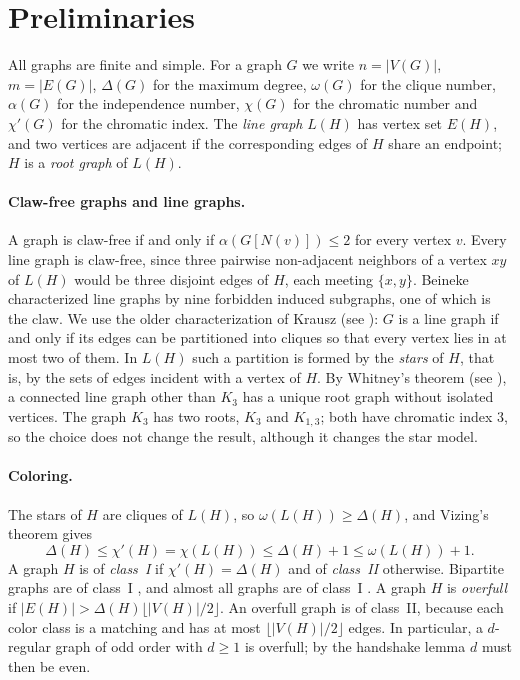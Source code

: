 \documentclass[11pt,a4paper]{article}
\begin{document}
\section{Preliminaries}

All graphs are finite and simple. For a graph $G$ we write $n=|V(G)|$,
$m=|E(G)|$, $\Delta(G)$ for the maximum degree, $\omega(G)$ for the clique
number, $\alpha(G)$ for the independence number, $\chi(G)$ for the chromatic
number and $\chi'(G)$ for the chromatic index. The \emph{line graph} $L(H)$ has
vertex set $E(H)$, and two vertices are adjacent if the corresponding edges of
$H$ share an endpoint; $H$ is a \emph{root graph} of $L(H)$.

\paragraph{Claw-free graphs and line graphs.}
A graph is claw-free if and only if $\alpha(G[N(v)])\le 2$ for every vertex $v$.
Every line graph is claw-free, since three pairwise non-adjacent neighbors of
a vertex $xy$ of $L(H)$ would be three disjoint edges of $H$, each meeting
$\{x,y\}$. Beineke \cite{beineke1970} characterized line graphs by nine
forbidden induced subgraphs, one of which is the claw. We use the older
characterization of Krausz (see \cite{beineke1970,liu2015}): $G$ is a line
graph if and only if its edges can be partitioned into cliques so that every
vertex lies in at most two of them. In $L(H)$ such a partition is formed by the
\emph{stars} of $H$, that is, by the sets of edges incident with a vertex of
$H$. By Whitney's theorem (see \cite{liu2015}), a connected line graph other
than $K_3$ has a unique root graph without isolated vertices. The graph $K_3$
has two roots, $K_3$ and $K_{1,3}$; both have chromatic index $3$, so the choice
does not change the result, although it changes the star model.

\paragraph{Coloring.}
The stars of $H$ are cliques of $L(H)$, so $\omega(L(H))\ge\Delta(H)$, and
Vizing's theorem gives
\begin{equation}\label{eq:vizing}
\Delta(H)\le\chi'(H)=\chi(L(H))\le\Delta(H)+1\le\omega(L(H))+1 .
\end{equation}
A graph $H$ is of \emph{class~I} if $\chi'(H)=\Delta(H)$ and of \emph{class~II}
otherwise. Bipartite graphs are of class~I \cite{konig1916}, and almost all
graphs are of class~I \cite{erdos1977}. A graph $H$ is \emph{overfull} if
$|E(H)|>\Delta(H)\lfloor |V(H)|/2\rfloor$. An overfull graph is of class~II,
because each color class is a matching and has at most
$\lfloor |V(H)|/2\rfloor$ edges. In particular, a $d$-regular graph of odd
order with $d\ge 1$ is overfull; by the handshake lemma $d$ must then be even.
\end{document}
